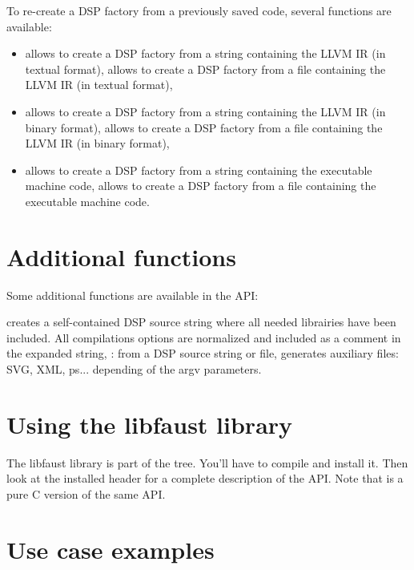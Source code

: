 To re-create a DSP factory from a previously saved code, several functions are available:

\begin{itemize}
\item {} allows to create a DSP factory from a string containing the LLVM IR (in textual format),  allows to create a DSP factory from a file containing the LLVM IR (in textual format),
\item {} allows to create a DSP factory from a string containing the LLVM IR (in binary format),  allows to create a DSP factory from a file containing the LLVM IR (in binary format),
\item {} allows to create a DSP factory from a string containing the executable machine code,  allows to create a DSP factory from a file containing the executable machine code.
\end{itemize}

\section{Additional functions}

Some additional functions are available in the API:

 creates a self-contained DSP source string where all needed librairies have been included. All compilations options are normalized and included as a comment in the expanded string,
: from a DSP source string or file, generates auxiliary files: SVG, XML, ps... depending of the argv parameters.

\section{Using the libfaust library}

The libfaust library is part of the \faust tree. You'll have to compile and install it. Then look at the installed  header for a complete description of the API. Note that  is a pure C version of the same API.

\section{Use case examples}

